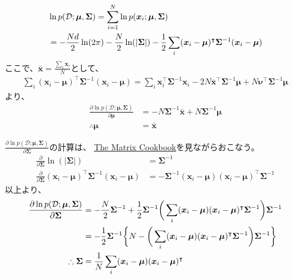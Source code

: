 \documentclass[aspectratio=169,unicode,dvipdfmx,14pt]{beamer}
\begin{document}
\begin{frame}
\FontMath
\begin{align}
& \ln p(\mathcal{D};\bm{\mu},\bm{\Sigma}) =\sum_{i=1}^N \ln p(\bm{x}_i;\bm{\mu},\bm{\Sigma}) \notag \\
& = - \frac{Nd}{2}\ln(2\pi) - \frac{N}{2}\ln(|\bm{\Sigma}|) - \frac{1}{2}\sum_i
(\bm{x}_i - \bm{\mu})^\intercal \bm{\Sigma}^{-1} (\bm{x}_i - \bm{\mu})
\end{align}
ここで、$\bar{\bm{x}}=\frac{\sum_i \bm{x}_i}{N}$として、
\begin{align}
\sum_i (\bm{x}_i - \bm{\mu})^\intercal \bm{\Sigma}^{-1} (\bm{x}_i - \bm{\mu})
= \sum_i \bm{x}_i^\intercal\bm{\Sigma}^{-1}\bm{x}_i 
- 2N\bar{\bm{x}}^\intercal\bm{\Sigma}^{-1}\bm{\mu}
+ N\bm{\nu}^\intercal\bm{\Sigma}^{-1}\bm{\mu}
\end{align}
より、
\begin{align}
\frac{\partial \ln p(\mathcal{D};\bm{\mu},\bm{\Sigma})}{\partial \bm{\mu}}
& = - N \bm{\Sigma}^{-1} \bar{\bm{x}} + N \bm{\Sigma}^{-1}\bm{\mu} \\
\therefore \bm{\mu} & = \bar{\bm{x}}
\end{align}
\end{frame}

\begin{frame}
\FontMath
$\frac{\partial \ln p(\mathcal{D};\bm{\mu},\bm{\Sigma})}{\partial \bm{\Sigma}}$の計算は、
\href{https://www.math.uwaterloo.ca/~hwolkowi/matrixcookbook.pdf}{The Matrix Cookbook}を見ながらおこなう。
\begin{align}
\frac{\partial}{\partial \bm{\Sigma}}\ln(|\bm{\Sigma}|) & = \bm{\Sigma}^{-1} \\
\frac{\partial}{\partial \bm{\Sigma}}
(\bm{x}_i - \bm{\mu})^\intercal \bm{\Sigma}^{-1} (\bm{x}_i - \bm{\mu})
& = - \bm{\Sigma}^{-1} (\bm{x}_i - \bm{\mu}) (\bm{x}_i - \bm{\mu})^\intercal \bm{\Sigma}^{-1}
\end{align}
以上より、
\begin{align}
\frac{\partial \ln p(\mathcal{D};\bm{\mu},\bm{\Sigma})}{\partial \bm{\Sigma}}
&= - \frac{N}{2}\bm{\Sigma}^{-1}
+ \frac{1}{2} \bm{\Sigma}^{-1}  \bigg( \sum_i
(\bm{x}_i - \bm{\mu}) (\bm{x}_i - \bm{\mu})^\intercal \bm{\Sigma}^{-1} \bigg) \bm{\Sigma}^{-1} \notag \\
&= - \frac{1}{2}\bm{\Sigma}^{-1} \bigg\{
N - \bigg( \sum_i
(\bm{x}_i - \bm{\mu}) (\bm{x}_i - \bm{\mu})^\intercal \bm{\Sigma}^{-1} \bigg) \bm{\Sigma}^{-1} \bigg\} \\
\therefore
\bm{\Sigma} &= \frac{1}{N}\sum_i
(\bm{x}_i - \bm{\mu}) (\bm{x}_i - \bm{\mu})^\intercal 
\end{align}
\end{frame}
\end{document}
